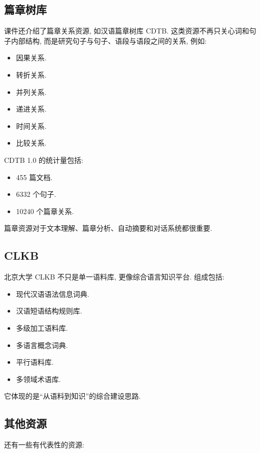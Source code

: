 \subsection{篇章树库}


课件还介绍了篇章关系资源, 如汉语篇章树库 CDTB.
这类资源不再只关心词和句子内部结构, 而是研究句子与句子、语段与语段之间的关系, 例如:

\begin{itemize}
\item 因果关系.
\item 转折关系.
\item 并列关系.
\item 递进关系.
\item 时间关系.
\item 比较关系.
\end{itemize}

CDTB 1.0 的统计量包括:

\begin{itemize}
\item 455 篇文档.
\item 6332 个句子.
\item 10240 个篇章关系.
\end{itemize}

篇章资源对于文本理解、篇章分析、自动摘要和对话系统都很重要.

\subsection{CLKB}


北京大学 CLKB 不只是单一语料库, 更像综合语言知识平台.
组成包括:

\begin{itemize}
\item 现代汉语语法信息词典.
\item 汉语短语结构规则库.
\item 多级加工语料库.
\item 多语言概念词典.
\item 平行语料库.
\item 多领域术语库.
\end{itemize}

它体现的是“从语料到知识”的综合建设思路.

\subsection{其他资源}


还有一些有代表性的资源:

